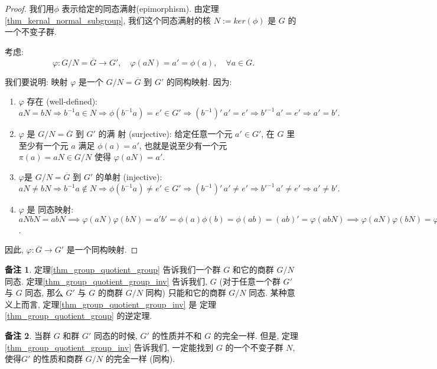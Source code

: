 \documentclass[utf8]{ctexbook}
\theoremstyle{definition}
\newtheorem{memo}{备注}[section]
\begin{document}
\begin{proof}
我们用$\phi$ 表示给定的同态满射(epimorphism). 由定理 \ref{thm_kernal_normal_subgroup}, 我们这个同态满射的核 $N := ker(\phi)$ 是 $G$ 的一个不变子群.

考虑:
$$ \varphi: G/N = \overline{G} \longrightarrow G',   \quad \varphi(aN) = a' = \phi (a), \quad  \forall a \in G .$$

我们要说明: 映射 $\varphi$ 是一个 $G/N=\overline{G}$ 到 $G'$ 的同构映射. 因为:
\begin{enumerate}
\item{$\varphi$ 存在 (well-defined): $aN = bN \Rightarrow b^{-1} a \in N \Rightarrow \phi( b^{-1}a ) = e' \in G' \Rightarrow (b^{-1})'\, a' = e' \Rightarrow {b'}^{-1} \, a' = e' \Rightarrow a' = b' .$}
\item{$\varphi$ 是 $G/N = \overline{G}$ 到 $G'$ 的满 射 (surjective): 给定任意一个元 $a' \in G'$, 在 $G$ 里至少有一个元 $a$ 满足 $\phi(a) = a'$, 也就是说至少有一个元 $ \pi(a) = aN \in G/N$ 使得 $\varphi(aN ) = a'$.}
\item{$\varphi$是 $G/N = \overline{G}$ 到 $G'$ 的单射 (injective): $aN \neq b N \Rightarrow b^{-1} a \not \in N \Rightarrow \phi(b^{-1}a) \neq e' \in G' \Rightarrow (b^{-1})'\, a' \neq e' \Rightarrow {b'}^{-1} \, a' \neq e' \Rightarrow a' \neq b'.$}
\item{$\varphi$ 是 同态映射: $aN bN = ab N \implies \varphi( aN ) \varphi ( bN) = a' b' = \phi(a) \phi(b) = \phi(ab) = (ab)' = \varphi(abN) \implies  \varphi( aN ) \varphi ( bN) =  \varphi(abN) $. }
\end{enumerate}

因此, $\varphi: \overline{G} \longrightarrow G'$ 是一个同构映射.
\end{proof}



\begin{memo}
定理\ref{thm_group_quotient_group} 告诉我们一个群 $G$ 和它的商群 $G/N$ 同态. 定理\ref{thm_group_quotient_group_inv} 告诉我们, $G$ (对于任意一个群 $G'$ 与 $G$ 同态, 那么 $G'$ 与 $G$ 的商群 $G/N$ 同构) 只能和它的商群 $G/N$ 同态. 某种意义上而言, 定理\ref{thm_group_quotient_group_inv} 是 定理\ref{thm_group_quotient_group} 的逆定理.
\end{memo}

\begin{memo}
当群 $G$ 和群 $G'$ 同态的时候, $G'$ 的性质并不和 $G$ 的完全一样. 但是, 定理\ref{thm_group_quotient_group_inv} 告诉我们, 一定能找到 $G$ 的一个不变子群 $N$, 使得$G'$ 的性质和商群 $G/N$ 的完全一样 (同构). 
\end{memo}
\end{document}
